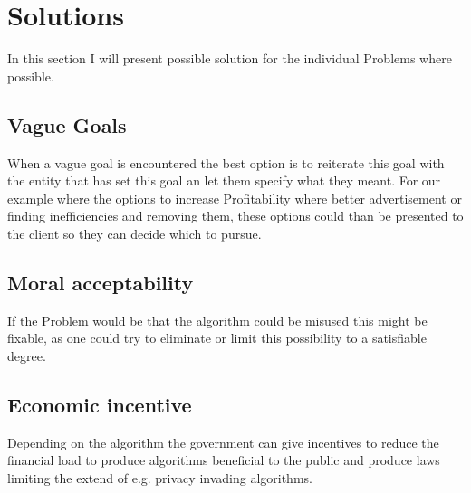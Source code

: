 \section{Solutions}
In this section I will present possible solution
for the individual Problems where possible.

\subsection{Vague Goals}
When a vague goal is encountered the best option is to reiterate this goal with the entity that has set this goal an let them specify what they meant. For our example where the options to increase Profitability where better advertisement or finding inefficiencies and removing them, these options could than be presented to the client so they can decide which to pursue.


\subsection{Moral acceptability}
If the Problem would be that the algorithm could be misused
this might be fixable, as one could try to eliminate or limit this possibility to a satisfiable degree.

\subsection{Economic incentive}
Depending on the algorithm the government can
give incentives to reduce the financial load
to produce algorithms beneficial to the public and
produce laws limiting the extend of e.g. privacy invading algorithms.














